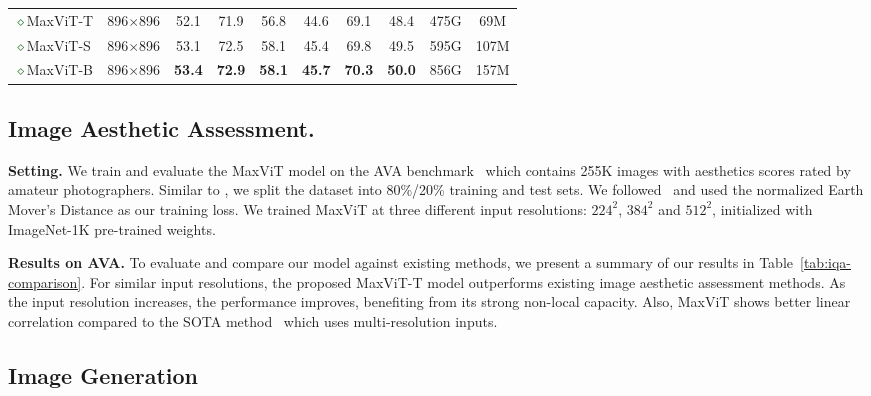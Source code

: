 \documentclass[runningheads]{llncs}
\begin{document}
\begin{table}[!ht]
\begin{tabular}{l|ccccccc|cc}
\midrule
\textcolor{darkgreen}{$\diamond$}MaxViT-T & 896$\times$896 & 52.1 & 71.9 & 56.8 & 44.6 & 69.1 & 48.4 & 475G & 69M\\
\textcolor{darkgreen}{$\diamond$}MaxViT-S & 896$\times$896 & 53.1 & 72.5 & 58.1 & 45.4 & 69.8 & 49.5 & 595G & 107M\\
\textcolor{darkgreen}{$\diamond$}MaxViT-B & 896$\times$896 & \textbf{53.4} & \textbf{72.9} & \textbf{58.1} & \textbf{45.7} & \textbf{70.3} & \textbf{50.0} & 856G & 157M \\
\end{tabular}
\label{tab:coco}
\end{table}


\subsection{Image Aesthetic Assessment.}

\textbf{Setting.} We train and evaluate the MaxViT model on the AVA benchmark~\cite{murray2012ava} which contains 255K images with aesthetics scores rated by amateur photographers. Similar to \cite{talebi2018nima}, we split the dataset into 80\%/20\% training and test sets. We followed~\cite{talebi2018nima} and used the normalized Earth Mover's Distance as our training loss. We trained MaxViT at three different input resolutions: $224^2$, $384^2$ and $512^2$, initialized with ImageNet-1K pre-trained weights.

\noindent\textbf{Results on AVA.} To evaluate and compare our model against existing methods, we present a summary of our results in Table~\ref{tab:iqa-comparison}. For similar input resolutions, the proposed MaxViT-T model outperforms existing image aesthetic assessment methods. As the input resolution increases, the performance improves, benefiting from its strong non-local capacity. Also, MaxViT shows better linear correlation compared to the SOTA method~\cite{ke2021musiq} which uses multi-resolution inputs. 









\subsection{Image Generation}
\label{ssec:gan}
\end{document}
